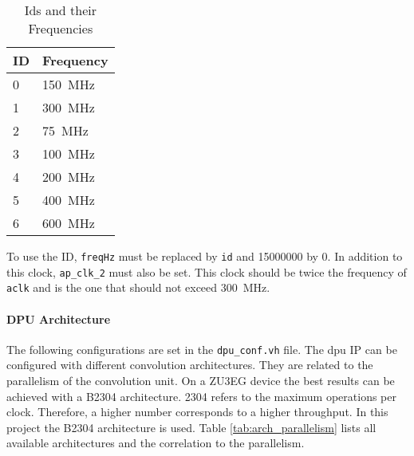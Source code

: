 \begin{table}
  \caption{Ids and their Frequencies}
  \label{tab:frequencies_ids}
  \centering
  \begin{tabular}{ll}
    \toprule
    \textbf{ID} & \textbf{Frequency} \\
    \midrule
    0 & \SI{150}{MHz} \\
    1 & \SI{300}{MHz} \\
    2 & \SI{75}{MHz} \\
    3 & \SI{100}{MHz} \\
    4 & \SI{200}{MHz} \\
    5 & \SI{400}{MHz} \\
    6 & \SI{600}{MHz} \\
    \bottomrule
  \end{tabular}
\end{table}

To use the ID, \texttt{freqHz} must be replaced by \texttt{id} and \num{15000000} by 0.
In addition to this clock, \texttt{ap\_clk\_2} must also be set.
This clock should be twice the frequency of \texttt{aclk} and is the one that should not exceed \SI{300}{MHz}.

\paragraph{DPU Architecture}
The following configurations are set in the \texttt{dpu\_conf.vh} file.
The \acrshort{dpu} IP can be configured with different convolution architectures.
They are related to the parallelism of the convolution unit.
On a ZU3EG device the best results can be achieved with a B2304 architecture.
\num{2304} refers to the maximum operations per clock.
Therefore, a higher number corresponds to a higher throughput.
In this project the B2304 architecture is used.
Table \ref{tab:arch_parallelism} lists all available architectures and the correlation to the parallelism.

